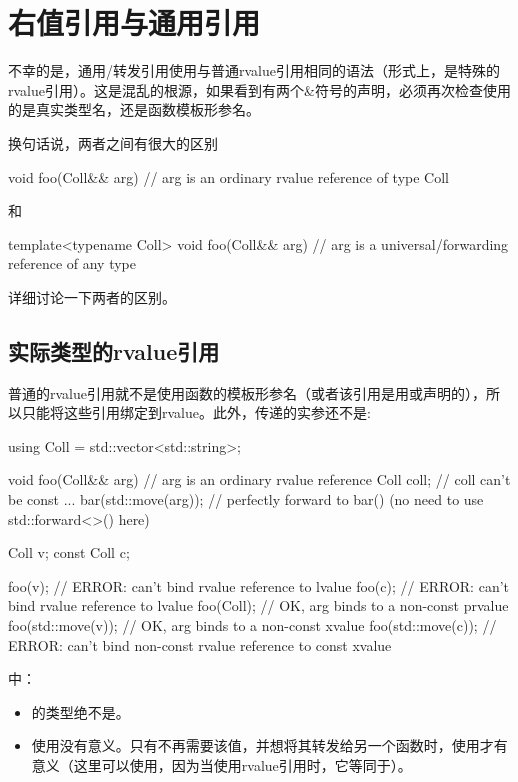 \section{右值引用与通用引用}
不幸的是，通用/转发引用使用与普通rvalue引用相同的语法（形式上，是特殊的rvalue引用）。这是混乱的根源，如果看到有两个\&符号的声明，必须再次检查使用的是真实类型名，还是函数模板形参名。

换句话说，两者之间有很大的区别

\begin{cppcode}
void foo(Coll&& arg) // arg is an ordinary rvalue reference of type Coll
\end{cppcode}

和

\begin{cppcode}
template<typename Coll>
void foo(Coll&& arg) // arg is a universal/forwarding reference of any type
\end{cppcode}

详细讨论一下两者的区别。

\subsection{实际类型的rvalue引用}

普通的rvalue引用就不是使用函数的模板形参名（或者该引用是用或声明的），所以只能将这些引用绑定到rvalue。此外，传递的实参还不是:

\begin{cppcode}
using Coll = std::vector<std::string>;

void foo(Coll&& arg) // arg is an ordinary rvalue reference
{
	Coll coll; // coll can’t be const
	...
	bar(std::move(arg)); // perfectly forward to bar() (no need to use std::forward<>() here)
}

Coll v;
const Coll c;

foo(v); // ERROR: can’t bind rvalue reference to lvalue
foo(c); // ERROR: can’t bind rvalue reference to lvalue
foo(Coll{}); // OK, arg binds to a non-const prvalue
foo(std::move(v)); // OK, arg binds to a non-const xvalue
foo(std::move(c)); // ERROR: can’t bind non-const rvalue reference to const xvalue
\end{cppcode}

中：

\begin{itemize}
	\item {}的类型绝不是。
	\item 使用没有意义。只有不再需要该值，并想将其转发给另一个函数时，使用才有意义（这里可以使用，因为当使用rvalue引用时，它等同于）。
\end{itemize}

